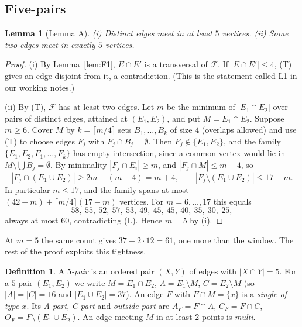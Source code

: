 \documentclass[11pt]{amsart}
\newtheorem{lemma}[theorem]{Lemma}
\theoremstyle{definition}
\newtheorem{definition}[theorem]{Definition}
\newcommand{\cF}{\mathcal{F}}
\begin{document}
\subsection{Five-pairs}
\begin{lemma}[Lemma A]\label{lem:A}
\textup{(i)} Distinct edges meet in at least $5$ vertices. \textup{(ii)} Some two edges meet in exactly $5$ vertices.
\end{lemma}
\begin{proof}
(i) By Lemma~\ref{lem:F1}, $E\cap E'$ is a transversal of $\cF$. If $|E\cap E'|\le 4$, (T) gives an edge disjoint from it, a contradiction. (This is the statement called L1 in our working notes.)

(ii) By (T), $\cF$ has at least two edges. Let $m$ be the minimum of $|E_1\cap E_2|$ over pairs of distinct edges, attained at $(E_1,E_2)$, and put $M=E_1\cap E_2$. Suppose $m\ge 6$. Cover $M$ by $k=\lceil m/4\rceil$ sets $B_1,\dots,B_k$ of size $4$ (overlaps allowed) and use (T) to choose edges $F_j$ with $F_j\cap B_j=\emptyset$. Then $F_j\notin\{E_1,E_2\}$, and the family $\{E_1,E_2,F_1,\dots,F_k\}$ has empty intersection, since a common vertex would lie in $M\setminus\bigcup B_j=\emptyset$. By minimality $|F_j\cap E_i|\ge m$, and $|F_j\cap M|\le m-4$, so
\[|F_j\cap(E_1\cup E_2)|\ge 2m-(m-4)=m+4,\qquad |F_j\setminus(E_1\cup E_2)|\le 17-m .\]
In particular $m\le 17$, and the family spans at most $(42-m)+\lceil m/4\rceil(17-m)$ vertices. For $m=6,\dots,17$ this equals
\[58,\ 55,\ 52,\ 57,\ 53,\ 49,\ 45,\ 45,\ 40,\ 35,\ 30,\ 25,\]
always at most $60$, contradicting (L). Hence $m=5$ by (i).
\end{proof}
At $m=5$ the same count gives $37+2\cdot 12=61$, one more than the window. The rest of the proof exploits this tightness.

\begin{definition}
A \emph{$5$-pair} is an ordered pair $(X,Y)$ of edges with $|X\cap Y|=5$. For a $5$-pair $(E_1,E_2)$ we write $M=E_1\cap E_2$, $A=E_1\setminus M$, $C=E_2\setminus M$ (so $|A|=|C|=16$ and $|E_1\cup E_2|=37$). An edge $F$ with $F\cap M=\{x\}$ is a \emph{single of type $x$}. Its \emph{A-part}, \emph{C-part} and \emph{outside part} are $A_F=F\cap A$, $C_F=F\cap C$, $O_F=F\setminus(E_1\cup E_2)$. An edge meeting $M$ in at least $2$ points is \emph{multi}.
\end{definition}
\end{document}

